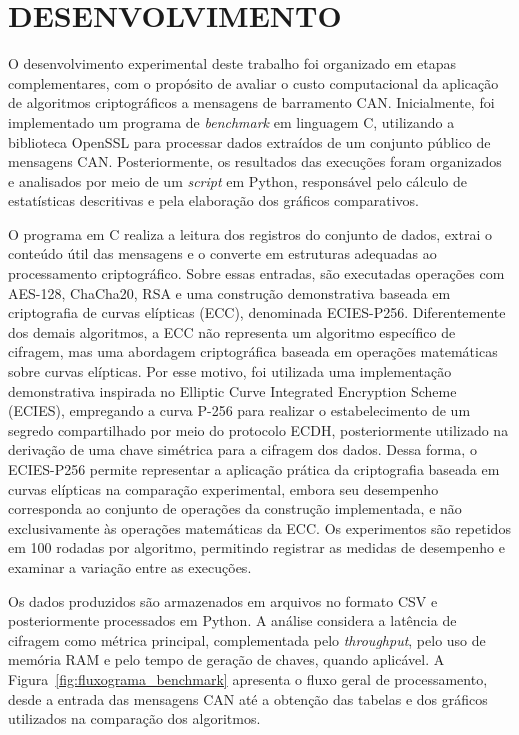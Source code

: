 \chapter{DESENVOLVIMENTO}

O desenvolvimento experimental deste trabalho foi organizado em etapas complementares, com o propósito de avaliar o custo computacional da aplicação de algoritmos criptográficos a mensagens de barramento CAN. Inicialmente, foi implementado um programa de \textit{benchmark} em linguagem C, utilizando a biblioteca OpenSSL para processar dados extraídos de um conjunto público de mensagens CAN. Posteriormente, os resultados das execuções foram organizados e analisados por meio de um \textit{script} em Python, responsável pelo cálculo de estatísticas descritivas e pela elaboração dos gráficos comparativos.

O programa em C realiza a leitura dos registros do conjunto de dados, extrai o conteúdo útil das mensagens e o converte em estruturas adequadas ao processamento criptográfico. Sobre essas entradas, são executadas operações com AES-128, ChaCha20, RSA e uma construção demonstrativa baseada em criptografia de curvas elípticas (ECC), denominada ECIES-P256. Diferentemente dos demais algoritmos, a ECC não representa um algoritmo específico de cifragem, mas uma abordagem criptográfica baseada em operações matemáticas sobre curvas elípticas. Por esse motivo, foi utilizada uma implementação demonstrativa inspirada no Elliptic Curve Integrated Encryption Scheme (ECIES), empregando a curva P-256 para realizar o estabelecimento de um segredo compartilhado por meio do protocolo ECDH, posteriormente utilizado na derivação de uma chave simétrica para a cifragem dos dados. Dessa forma, o ECIES-P256 permite representar a aplicação prática da criptografia baseada em curvas elípticas na comparação experimental, embora seu desempenho corresponda ao conjunto de operações da construção implementada, e não exclusivamente às operações matemáticas da ECC. Os experimentos são repetidos em 100 rodadas por algoritmo, permitindo registrar as medidas de desempenho e examinar a variação entre as execuções.

Os dados produzidos são armazenados em arquivos no formato CSV e posteriormente processados em Python. A análise considera a latência de cifragem como métrica principal, complementada pelo \textit{throughput}, pelo uso de memória RAM e pelo tempo de geração de chaves, quando aplicável. A Figura~\ref{fig:fluxograma_benchmark} apresenta o fluxo geral de processamento, desde a entrada das mensagens CAN até a obtenção das tabelas e dos gráficos utilizados na comparação dos algoritmos.


